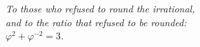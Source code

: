 %
%

\chapter*{}
\thispagestyle{empty}
\vspace*{4cm}
\begin{center}
\itshape
To those who refused to round the irrational,\\
and to the ratio that refused to be rounded:\\
\medskip
\(\varphi^{2} + \varphi^{-2} = 3\).
\end{center}
\vfill
